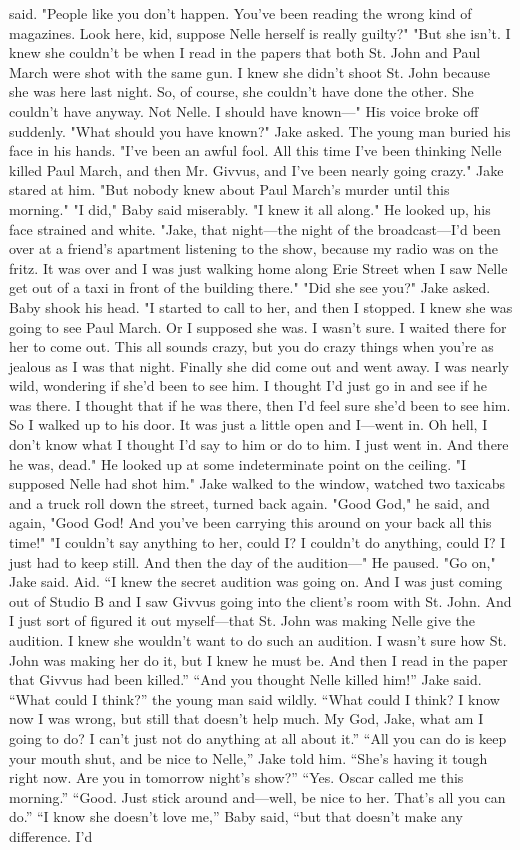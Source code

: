 \documentclass{novel}
\begin{document}
said. "People like you don't happen. You've been reading the wrong kind of magazines. Look here, kid, suppose Nelle herself is really guilty?" "But she isn't. I knew she couldn't be when I read in the papers that both St. John and Paul March were shot with the same gun. I knew she didn't shoot St. John because she was here last night. So, of course, she couldn't have done the other. She couldn't have anyway. Not Nelle. I should have known—" His voice broke off suddenly. "What should you have known?" Jake asked. The young man buried his face in his hands. "I've been an awful fool. All this time I've been thinking Nelle killed Paul March, and then Mr. Givvus, and I've been nearly going crazy." Jake stared at him. "But nobody knew about Paul March's murder until this morning." "I did," Baby said miserably. "I knew it all along." He looked up, his face strained and white. "Jake, that night—the night of the broadcast—I'd been over at a friend's apartment listening to the show, because my radio was on the fritz. It was over and I was just walking home along Erie Street when I saw Nelle get out of a taxi in front of the building there." "Did she see you?" Jake asked. Baby shook his head. "I started to call to her, and then I stopped. I knew she was going to see Paul March. Or I supposed she was. I wasn't sure. I waited there for her to come out. This all sounds crazy, but you do crazy things when you're as jealous as I was that night. Finally she did come out and went away. I was nearly wild, wondering if she'd been to see him. I thought I'd just go in and see if he was there. I thought that if he was there, then I'd feel sure she'd been to see him. So I walked up to his door. It was just a little open and I—went in. Oh hell, I don't know what I thought I'd say to him or do to him. I just went in. And there he was, dead." He looked up at some indeterminate point on the ceiling. "I supposed Nelle had shot him." Jake walked to the window, watched two taxicabs and a truck roll down the street, turned back again. "Good God," he said, and again, "Good God! And you've been carrying this around on your back all this time!" "I couldn't say anything to her, could I? I couldn't do anything, could I? I just had to keep still. And then the day of the audition—" He paused. "Go on," Jake said. Aid. “I knew the secret audition was going on. And I was just coming out of Studio B and I saw Givvus going into the client’s room with St. John. And I just sort of figured it out myself—that St. John was making Nelle give the audition. I knew she wouldn’t want to do such an audition. I wasn’t sure how St. John was making her do it, but I knew he must be. And then I read in the paper that Givvus had been killed.” “And you thought Nelle killed him!” Jake said. “What could I think?” the young man said wildly. “What could I think? I know now I was wrong, but still that doesn’t help much. My God, Jake, what am I going to do? I can’t just not do anything at all about it.” “All you can do is keep your mouth shut, and be nice to Nelle,” Jake told him. “She’s having it tough right now. Are you in tomorrow night’s show?” “Yes. Oscar called me this morning.” “Good. Just stick around and—well, be nice to her. That’s all you can do.” “I know she doesn’t love me,” Baby said, “but that doesn’t make any difference. I’d 
\end{document}
